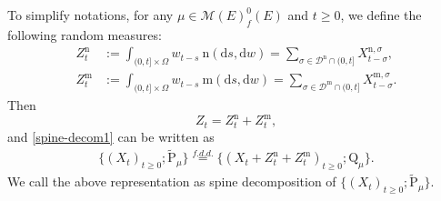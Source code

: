 \documentclass[12pt,a4paper]{amsart}
\numberwithin{equation}{section}
\theoremstyle{plain}
\theoremstyle{definition}
\theoremstyle{remark}
\begin{document}
To simplify notations, for any $\mu \in \mathcal M(E)^0_f(E)$ and	$t\geq 0$,  we define the following random measures:
\begin{align}
	Z^{\mathrm n}_t
	&:= \int_{(0, t]\times \Omega} w_{t-s} ~\mathrm n (\mathrm ds, \mathrm dw)
	= \sum_{\sigma \in \mathcal D^\mathrm n \cap (0, t]} X^{\mathrm n,\sigma}_{t-\sigma},
	\\ Z^{\mathrm m}_t
	&:= \int_{(0, t]\times \Omega} w_{t-s} ~\mathrm m (\mathrm ds, \mathrm dw)
	= \sum_{\sigma \in \mathcal D^\mathrm m \cap (0, t]} X^{\mathrm m,\sigma}_{t-\sigma}.
\end{align}
Then \begin{equation}\label{def-Zt}
	Z_t= Z^{\mathrm n}_{t} + Z^{\mathrm m}_{t},
\end{equation}
and \eqref{spine-decom1} can be written as
\begin{align}\label{spine-decom2}
	\{(X_t)_{t\geq 0}; \widetilde{\mathrm P}_\mu\}
	\overset{f.d.d.}{=}
	\{(X_t + Z^{\mathrm n}_{t} + Z^{\mathrm m}_{t} )_{t\geq 0}; \mathrm Q_\mu\}.
\end{align}
We call the above representation as spine decomposition of $\{(X_t)_{t\geq 0}; \widetilde{\mathrm P}_\mu\} $.
\end{document}
